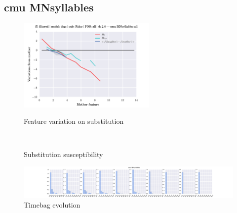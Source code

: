 \subsection{cmu MNsyllables}
\begin{figure}[h!]
    \centering
    \includegraphics[width=0.6\textwidth]{images/feature-cards/cmu_MNsyllables/feature_variations.png}
    \caption{Feature variation on substitution}
	~
	\caption{Substitution susceptibility}
    \includegraphics[width=\textwidth]{images/feature-cards/cmu_MNsyllables/timebags_evolution-hist.png}
	\caption{Timebag evolution}
\end{figure}


\clearpage
